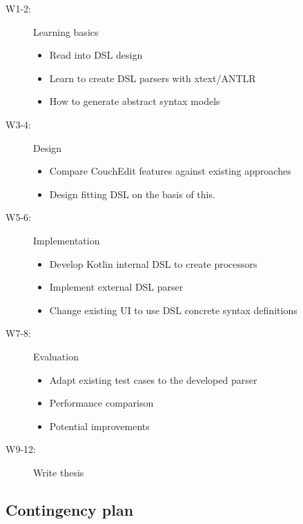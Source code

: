 \documentclass[10pt,a4paper,oneside]{scrartcl}
\newcommand\hint[2]{
\ifthenelse{\boolean{showhints}}{
\begin{center}
\colorbox{black!10}{
\begin{minipage}{.963\textwidth}
#2\hfill\textbf{#1}
\end{minipage}
}\end{center}}{}
}
\begin{document}
\begin{description}
  \item[W1-2:] Learning basics
        \begin{itemize}
          \item Read into DSL design
          \item Learn to create DSL parsers with xtext/ANTLR
          \item How to generate abstract syntax models
        \end{itemize}
  \item[W3-4:] Design
        \begin{itemize}
          \item Compare CouchEdit features against existing approaches
          \item Design fitting DSL on the basis of this.
        \end{itemize}
  \item[W5-6:] Implementation
        \begin{itemize}
          \item Develop Kotlin internal DSL to create processors
          \item Implement external DSL parser
          \item Change existing UI to use DSL concrete syntax definitions
        \end{itemize}
  \item[W7-8:] Evaluation
        \begin{itemize}
          \item Adapt existing test cases to the developed parser
          \item Performance comparison
          \item Potential improvements
        \end{itemize}
  \item[W9-12:] Write thesis
\end{description}

\subsection{Contingency plan}
\label{sub:contingency}

\end{document}
